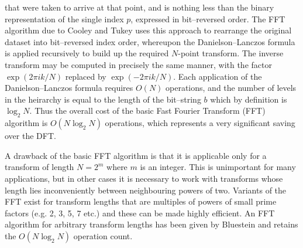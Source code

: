 \documentclass[dvips]{article}
\begin{document}
that were taken to arrive at that point, and is nothing less than 
the binary representation of the single index $p$, expressed in
bit--reversed order.  The FFT algorithm due to Cooley and Tukey
\cite{CooleyTukey} uses this approach to rearrange the original dataset
into bit--reversed index order, whereupon the
Danielson--Lanczos formula is applied recursively to build up the required
$N$-point
transform.  The inverse transform may be computed in precisely the same
manner, with the factor $\exp{(2\pi i k/N)}$ replaced by
$\exp{(-2\pi i k/N)}$.
Each application of the Danielson--Lanczos formula requires $O(N)$ operations,
and
the number of levels in the heirarchy is equal to the length of the
bit--string $b$ which by definition is $\log_{2}{N}$.
Thus the overall cost of the basic Fast Fourier Transform
(FFT) algorithm is $O(N\log_{2}N)$ operations, which represents a very
significant saving over the DFT.

A drawback of the basic FFT algorithm 
is that it is applicable only for a transform of length $N=2^{m}$ where $m$
is an integer.  This is unimportant for many applications, but in other
cases it is necessary to work with transforms whose length lies 
inconveniently between neighbouring powers of two.  Variants of the FFT
exist for
transform lengths that are multiples of powers of small prime factors
(e.g. 2, 3, 5, 7 etc.) and these can be made highly efficient.  An FFT
algorithm for arbitrary transform lengths has been given by Bluestein
\cite{bluestein} and retains the $O(N\log_{2}N)$ operation count.
\end{document}
